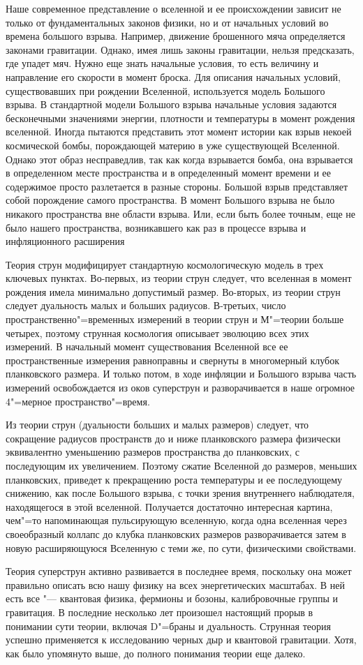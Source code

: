 Наше современное представление о вселенной и ее происхождении зависит не только от фундаментальных законов физики, но и от начальных условий во времена большого взрыва.
Например, движение брошенного мяча определяется законами гравитации. Однако, имея лишь законы гравитации, нельзя предсказать,
где упадет мяч. Нужно еще знать начальные условия, то есть величину и направление его скорости в момент броска.
Для описания начальных условий, существовавших при рождении Вселенной, используется модель Большого взрыва.
В стандартной модели Большого взрыва начальные условия задаются бесконечными значениями энергии, плотности и температуры в момент рождения вселенной.
Иногда пытаются представить этот момент истории как взрыв некоей космической бомбы, порождающей материю в уже существующей Вселенной.
Однако этот образ несправедлив, так как когда взрывается бомба, она взрывается в определенном месте пространства и в определенный момент времени и ее содержимое просто разлетается в разные стороны.
Большой взрыв представляет собой порождение самого пространства. В момент Большого взрыва не было никакого пространства вне области взрыва.
Или, если быть более точным, еще не было нашего пространства, возникавшего как раз в процессе взрыва и инфляционного расширения

Теория струн модифицирует стандартную космологическую модель в трех ключевых пунктах.
Во-первых, из теории струн следует, что вселенная в момент рождения имела минимально допустимый размер.
Во-вторых, из теории струн следует дуальность малых и больших радиусов.
В-третьих, число пространственно"=временных измерений в теории струн и М"=теории больше четырех, поэтому струнная космология описывает эволюцию всех этих измерений.
В начальный момент существования Вселенной все ее пространственные измерения равноправны и свернуты в многомерный клубок планковского размера.
И только потом, в ходе инфляции и Большого взрыва часть измерений освобождается из оков суперструн и разворачивается в наше огромное 4"=мерное пространство"=время.

Из теории струн (дуальности больших и малых размеров) следует, что сокращение радиусов пространств до и ниже планковского размера физически эквивалентно уменьшению размеров пространства до планковских, с последующим их увеличением.
Поэтому сжатие Вселенной до размеров, меньших планковских, приведет к прекращению роста температуры и ее последующему снижению, как после Большого взрыва, с точки зрения внутреннего наблюдателя, находящегося в этой вселенной.
Получается достаточно интересная картина, чем"=то напоминающая пульсирующую вселенную, когда одна вселенная через своеобразный коллапс до клубка планковских размеров разворачивается затем в новую расширяющуюся Вселенную с теми же, по сути, физическими свойствами.

Теория суперструн активно развивается в последнее время, поскольку она может правильно описать всю нашу физику на всех энергетических масштабах.
В ней есть все "--- квантовая физика, фермионы и бозоны, калибровочные группы и гравитация.
В последние несколько лет произошел настоящий прорыв в понимании сути теории, включая D"=браны и дуальность.
Струнная теория успешно применяется к исследованию черных дыр и квантовой гравитации.
Хотя, как было упомянуто выше, до полного понимания теории еще далеко.